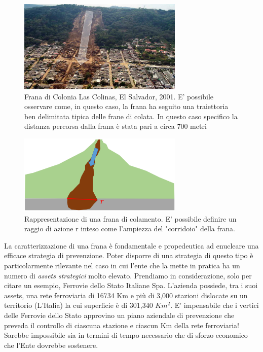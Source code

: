 \begin{figure}[h]
	\centering
	\includegraphics[width=0.7\textwidth]{images/traiettoria_frana}
	\caption{Frana di Colonia Las Colinas, El Salvador, 2001. E' possibile osservare come, in questo caso, la frana ha seguito una traiettoria ben delimitata tipica delle frane di colata. In questo caso specifico la distanza percorsa dalla frana è stata pari a circa 700 metri \cite{konagai2002colinas}}
	\label{traiettoriaFrana}
\end{figure}


\begin{figure}[h]
	\centering
	\includegraphics[width=0.7\textwidth]{images/traiettoria_frana2}
	\caption{Rappresentazione di una frana di colamento. E' possibile definire un raggio di azione r inteso come l'ampiezza del "corridoio" della frana.}
	\label{traiettoriaFrana2}
\end{figure}

La caratterizzazione di una frana è fondamentale e propedeutica ad enucleare una efficace strategia di prevenzione. Poter disporre di una strategia di questo tipo è particolarmente rilevante nel caso in cui l'ente che la mette in pratica ha un numero di \textit{assets strategici} molto elevato. Prendiamo in considerazione, solo per citare un esempio, Ferrovie dello Stato Italiane Spa. L'azienda possiede, tra i suoi assets, una rete ferroviaria di 16734 Km e più di 3,000 stazioni dislocate su un territorio (L'Italia) la cui superficie è di 301,340 $Km^2$. E' impensabile che i vertici delle Ferrovie dello Stato approvino un piano aziendale di prevenzione che preveda il controllo di ciascuna stazione e ciascun Km della rete ferroviaria! Sarebbe impossibile sia in termini di tempo necessario che di sforzo economico che l'Ente dovrebbe sostenere. 

